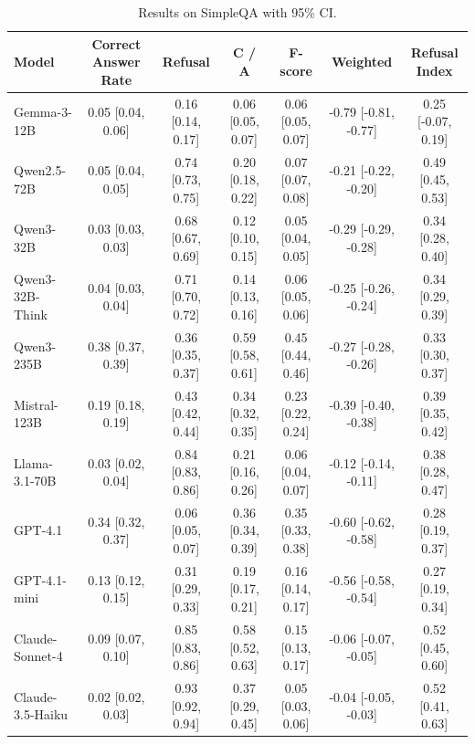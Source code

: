 \begin{table}[h]
    \centering
    \tiny
    \caption{Results on SimpleQA with 95\% CI.}
    \label{tab:simpleqa_model_comparison}
    \begin{tabularx}{\textwidth}{X c c c c c c}
    \toprule
    \textbf{Model} & \textbf{Correct Answer Rate} & \textbf{Refusal} & \textbf{C / A} & \textbf{F-score} & \textbf{Weighted} & \textbf{Refusal Index} \\
    \midrule
    Gemma-3-12B                     & 0.05 [0.04, 0.06] & 0.16 [0.14, 0.17] & 0.06 [0.05, 0.07] & 0.06 [0.05, 0.07] & -0.79 [-0.81, -0.77] & 0.25 [-0.07, 0.19] \\
    Qwen2.5-72B                    & 0.05 [0.04, 0.05] & 0.74 [0.73, 0.75] & 0.20 [0.18, 0.22] & 0.07 [0.07, 0.08] & -0.21 [-0.22, -0.20] & 0.49 [0.45, 0.53] \\
    Qwen3-32B                      & 0.03 [0.03, 0.03] & 0.68 [0.67, 0.69] & 0.12 [0.10, 0.15] & 0.05 [0.04, 0.05] & -0.29 [-0.29, -0.28] & 0.34 [0.28, 0.40] \\
    Qwen3-32B-Think                & 0.04 [0.03, 0.04] & 0.71 [0.70, 0.72] & 0.14 [0.13, 0.16] & 0.06 [0.05, 0.06] & -0.25 [-0.26, -0.24] & 0.34 [0.29, 0.39] \\
    Qwen3-235B                     & 0.38 [0.37, 0.39] & 0.36 [0.35, 0.37] & 0.59 [0.58, 0.61] & 0.45 [0.44, 0.46] & -0.27 [-0.28, -0.26] & 0.33 [0.30, 0.37] \\
    Mistral-123B                   & 0.19 [0.18, 0.19] & 0.43 [0.42, 0.44] & 0.34 [0.32, 0.35] & 0.23 [0.22, 0.24] & -0.39 [-0.40, -0.38] & 0.39 [0.35, 0.42] \\
    Llama-3.1-70B                  & 0.03 [0.02, 0.04] & 0.84 [0.83, 0.86] & 0.21 [0.16, 0.26] & 0.06 [0.04, 0.07] & -0.12 [-0.14, -0.11] & 0.38 [0.28, 0.47] \\
    GPT-4.1                        & 0.34 [0.32, 0.37] & 0.06 [0.05, 0.07] & 0.36 [0.34, 0.39] & 0.35 [0.33, 0.38] & -0.60 [-0.62, -0.58] & 0.28 [0.19, 0.37] \\
    GPT-4.1-mini                   & 0.13 [0.12, 0.15] & 0.31 [0.29, 0.33] & 0.19 [0.17, 0.21] & 0.16 [0.14, 0.17] & -0.56 [-0.58, -0.54] & 0.27 [0.19, 0.34] \\
    Claude-Sonnet-4                & 0.09 [0.07, 0.10] & 0.85 [0.83, 0.86] & 0.58 [0.52, 0.63] & 0.15 [0.13, 0.17] & -0.06 [-0.07, -0.05] & 0.52 [0.45, 0.60] \\
    Claude-3.5-Haiku               & 0.02 [0.02, 0.03] & 0.93 [0.92, 0.94] & 0.37 [0.29, 0.45] & 0.05 [0.03, 0.06] & -0.04 [-0.05, -0.03] & 0.52 [0.41, 0.63] \\

\end{tabularx}
\end{table}
